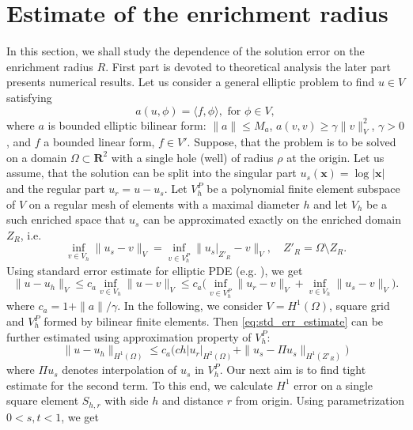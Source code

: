\documentclass{elsarticle}
\def\vc#1{\mathbf{\boldsymbol{#1}}}     %
\def\abs#1{\left|#1\right|}
\def\norm#1{\| #1 \|}
\def\abs#1{| #1 |}
\newcommand{\R}{\mathbf{R}}
\begin{document}
\section{Estimate of the enrichment radius} \label{sec:enrichemnt_radius}
In this section, we shall study the dependence of the solution error on the enrichment radius $R$. First part is devoted to 
theoretical analysis the later part presents numerical results.
Let us consider a general elliptic problem to find $u\in V$ satisfying
\[
   a(u, \phi) = \langle f, \phi \rangle, \text{ for } \phi \in V,
\]
where $a$ is bounded elliptic bilinear form: $\norm{a}\le M_a$, $a(v, v) \ge \gamma \norm{v}_V^2$, $\gamma>0$, and $f$ a bounded linear form, $f\in V'$. 
Suppose, that the problem is to be solved on a domain $\Omega \subset \R^2$ with a single hole (well) of radius $\rho$ at the origin. 
Let us assume, that the solution can be split into the singular part $u_s(\vc x)= \log |\vc x|$ and the regular part $u_r=u-u_s$.
Let $V^P_h$ be a polynomial finite element subspace of $V$ on a regular mesh of elements with a maximal diameter $h$
and let $V_h$ be a such enriched space that $u_s$ can be approximated exactly on the enriched domain $Z_R$, i.e.
\[
   \inf_{v\in V_h} \norm{u_s - v}_V = \inf_{v\in V^P_h} \norm{u_s|_{Z'_R} - v}_V, \quad Z'_R = \Omega\setminus Z_R.
\]
Using standard error estimate for elliptic PDE (e.g. \cite[Theorem 13.1]{ciarlet_basic_1991}), we get
\begin{equation}
    \label{eq:std_err_estimate}
    \norm{u - u_h}_{V} \le c_a \inf_{v \in V_h} \norm{u - v}_{V} 
    \le c_a \big(\inf_{v \in V^P_h} \norm{u_r - v}_{V} + \inf_{v \in V_h} \norm{u_s - v}_{V} \big).   
\end{equation}
where $c_a=1+\norm{a}/\gamma$.
In the following, we consider $V=H^1(\Omega)$, square grid and $V^P_h$ formed by bilinear finite elements. 
Then \eqref{eq:std_err_estimate} can be further estimated using approximation property of $V^P_h$:
\begin{equation}
    \label{eq:particular_estimate}
    \norm{u - u_h}_{H^1(\Omega)} \le c_a \big(c h \abs{u_r}_{H^2(\Omega)} + \norm{u_s - \Pi u_s}_{H^1(Z'_R)} \big)   
\end{equation}
where $\Pi u_s$ denotes interpolation of $u_s$ in $V^P_h$. Our next aim is to find tight estimate for the second term.
To this end, we calculate $H^1$ error on a single square element $S_{h,r}$ with side $h$ and distance $r$ from origin.
Using parametrization $0<s,t<1$,  we get
\end{document}
